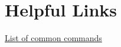 \documentclass[12pt]{article}
\begin{document}

	\nocite{*} %

	\newpage %
	\backmatter
	\printbibliography

	\newpage %
	\printindex

	\newpage %
	\appendix
		\section{Helpful Links}
		\href{https://www.mathworks.com/content/dam/mathworks/fact-sheet/matlab-basic-functions-reference.pdf}{List of common commands}
\end{document}
